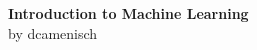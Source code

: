 \documentclass[10pt, landscape, a4paper]{article}
\begin{document}
\begin{multicols*}{3}


\begin{center}
	\Large{\textbf{Introduction to Machine Learning}} \\
    \small{by dcamenisch}
\end{center}












\end{multicols*}
\end{document}
